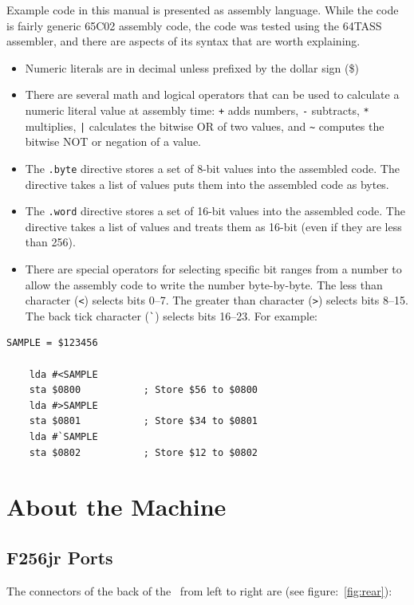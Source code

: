 Example code in this manual is presented as assembly language. While the code is fairly generic 65C02 assembly code, the code was tested using the 64TASS assembler, and there are aspects of its syntax that are worth explaining.

\begin{itemize}
\item Numeric literals are in decimal unless prefixed by the dollar sign (\$)
\item There are several math and logical operators that can be used to calculate a numeric literal value at assembly time: \verb|+| adds numbers, \verb+-+ subtracts, \verb+*+ multiplies, \verb+|+ calculates the bitwise OR of two values, and \verb+~+ computes the bitwise NOT or negation of a value.
\item The \verb+.byte+ directive stores a set of 8-bit values into the assembled code. The directive takes a list of values puts them into the assembled code as bytes.
\item The \verb+.word+ directive stores a set of 16-bit values into the assembled code. The directive takes a list of values and treats them as 16-bit (even if they are less than 256).
\item There are special operators for selecting specific bit ranges from a number to allow the assembly code to write the number byte-by-byte. The less than character (\verb+<+) selects bits 0--7. The greater than character (\verb+>+) selects bits 8--15. The back tick character (\verb+`+) selects bits 16--23. For example:
\end{itemize}

\begin{Verbatim}[samepage=true]
    SAMPLE = $123456

    lda #<SAMPLE
    sta $0800           ; Store $56 to $0800
    lda #>SAMPLE
    sta $0801           ; Store $34 to $0801
    lda #`SAMPLE
    sta $0802           ; Store $12 to $0802
\end{Verbatim}

\section*{About the Machine}

\subsection*{F256jr Ports}

The connectors of the back of the \fjr\ from left to right are (see figure:~\ref{fig:rear}):

